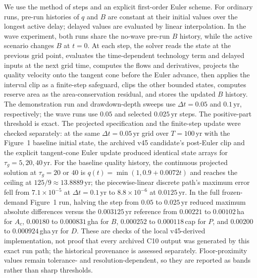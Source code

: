 We use the method of steps and an explicit first-order Euler scheme. For ordinary runs, pre-run histories of $q$ and $B$ are constant at their initial values over the longest active delay; delayed values are evaluated by linear interpolation. In the wave experiment, both runs share the no-wave pre-run $B$ history, while the active scenario changes $B$ at $t=0$. At each step, the solver reads the state at the previous grid point, evaluates the time-dependent technology term and delayed inputs at the next grid time, computes the flows and derivatives, projects the quality velocity onto the tangent cone before the Euler advance, then applies the interval clip as a finite-step safeguard, clips the other bounded states, computes reserve area as the area-conservation residual, and stores the updated $B$ history. The demonstration run and drawdown-depth sweeps use $\Delta t=0.05$ and $0.1$\,yr, respectively; the wave runs use $0.05$ and selected $0.025$\,yr steps. The positive-part threshold is exact. The projected specification and the finite-step update were checked separately: at the same $\Delta t=0.05$\,yr grid over $T=100$\,yr with the Figure~1 baseline initial state, the archived v45 candidate's post-Euler clip and the explicit tangent-cone Euler update produced identical state arrays for $\tau_g=5,20,40$\,yr. For the baseline quality history, the continuous projected solution at $\tau_g=20$ or $40$ is $q(t)=\min(1,0.9+0.0072t)$ and reaches the ceiling at $125/9\approx13.8889$\,yr; the piecewise-linear discrete path's maximum error fell from $7.1\times10^{-5}$ at $\Delta t=0.1$\,yr to $8.8\times10^{-6}$ at $0.0125$\,yr. In the full frozen-demand Figure~1 run, halving the step from $0.05$ to $0.025$\,yr reduced maximum absolute differences versus the $0.003125$\,yr reference from $0.00221$ to $0.00102$\,ha for $A_c$, $0.00180$ to $0.000831$\,gha for $B$, $0.000252$ to $0.000118$\,cap for $P$, and $0.00200$ to $0.000924$\,gha\,yr for $D$. These are checks of the local v45-derived implementation, not proof that every archived C10 output was generated by this exact run path; the historical provenance is assessed separately. Floor-proximity values remain tolerance- and resolution-dependent, so they are reported as bands rather than sharp thresholds.
